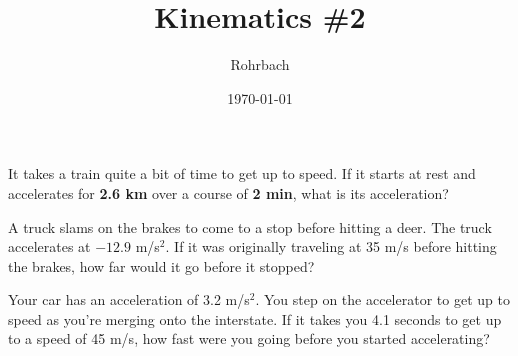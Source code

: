 \documentclass[10pt]{exam}
\title{Kinematics \#2}
\author{Rohrbach}
\date{\today}
\begin{document}
\maketitle

\printeqs

\begin{questions}
  \question  
    It takes a train quite a bit of time to get up to speed.  If it starts at rest and accelerates for \textbf{2.6 km} over a course of \textbf{2 min}, what is its acceleration?
    \vs

  \question
    A truck slams on the brakes to come to a stop before hitting a deer.  The truck accelerates at $-12.9$ m/s$^2$.  If it was originally traveling at 35 m/s before hitting the brakes, how far would it go before it stopped?
    \vs

  \question
    Your car has an acceleration of 3.2 m/s$^2$.  You step on the accelerator to get up to speed as you're merging onto the interstate.  If it takes you 4.1 seconds to get up to a speed of 45 m/s, how fast were you going before you started accelerating?
    \vs

    
  
\end{questions}
\end{document}
